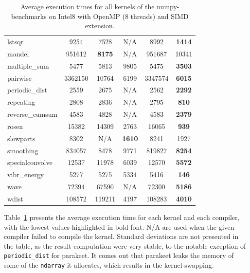 \documentclass[10pt, preprint]{sigplanconf}
\begin{document}
\begin{table}[t]
{\begin{tabular}{|l||c|c|c|c|c|}
                      lstsqr &    9254 &          7528 &             N/A &    8992 & \textbf{1414} \\
                      mandel &  951612 & \textbf{8175} &             N/A &  951687 &         10341 \\
               multiple\_sum &    5477 &          5813 &          9805 &    5475 & \textbf{3503} \\
                    pairwise & 3362150 &         10764 &          6199 & 3347574 & \textbf{6015} \\
              periodic\_dist &    2559 &          2675 &             N/A &    2562 & \textbf{2292} \\
                   repeating &    2808 &          2836 &             N/A &    2795 &  \textbf{810} \\
             reverse\_cumsum &    4583 &          4828 &             N/A &    4583 & \textbf{2379} \\
                       rosen &   15382 &         14309 &          2763 &   16065 &  \textbf{939} \\
                   slowparts &    8302 &             N/A & \textbf{1610} &    8241 &          1927 \\
                   smoothing &  834057 &          8478 &          9771 &  819827 & \textbf{8254} \\
             specialconvolve &   12537 &         11978 &          6039 &   12570 & \textbf{5572} \\
                vibr\_energy &    5277 &          5275 &          5334 &    5416 &  \textbf{146} \\
                        wave &   72394 &         67590 &             N/A &   72300 & \textbf{5186} \\
                       wdist &  108572 &        119211 &          4197 &  108283 & \textbf{4010} \\
\hline
\end{tabular}
}
\caption{Average execution times for all kernels of the numpy-benchmarks on Intel8 with OpenMP (8 threads) and SIMD extension.}
\label{tbl:overview}
\end{table}

Table~\ref{tbl:overview} presents the average execution time for each kernel
and each compiler, with the lowest values highlighted in bold font. N/A are
used when the given compiler failed to compile the kernel. Standard deviations
are not presented in the table, as the result computation were very stable, to
the notable exception of \texttt{periodic\_dist} for parakeet. It comes out
that parakeet leaks the memory of some of the \texttt{ndarray} it allocates,
which results in the kernel swapping.
\end{document}
